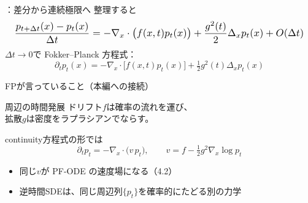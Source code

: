 \assuppl
\begin{frame}{\supplmark：差分から連続極限へ}
    整理すると
    \[
        \resizebox{0.98\textwidth}{!}{$
        \dfrac{p_{t+\Delta t}(x)-p_t(x)}{\Delta t}
        =
        -\nabla_x\cdot\bigl(f(x,t)p_t(x)\bigr)
        +
        \dfrac{g^{2}(t)}{2}\Delta_x p_t(x)
        + O(\Delta t)
        $}
    \]
    $\Delta t\to 0$で Fokker--Planck 方程式：
    \[
        \partial_t p_t(x)
        =
        -\nabla_x\cdot\bigl[f(x,t)p_t(x)\bigr]
        +
        \tfrac12 g^{2}(t)\Delta_x p_t(x)
        \tag{4.2.1}
    \]
\end{frame}
\asmain
\begin{frame}{FPが言っていること（本編への接続）}
    \begin{block}{周辺の時間発展}
        ドリフト$f$は確率の流れを運び、\\
        拡散$g$は密度をラプラシアンでならす。
    \end{block}
    continuity方程式の形では
    \[
        \partial_t p_t
        =
        -\nabla_x\cdot\bigl(v\,p_t\bigr),
        \qquad
        v
        =
        f - \tfrac12 g^{2}\nabla_x\log p_t
    \]
    \begin{itemize}
        \item 同じ$v$が PF-ODE の速度場になる（4.2）
        \item 逆時間SDEは、同じ周辺列$\{p_t\}$を確率的にたどる別の力学
    \end{itemize}
\end{frame}
